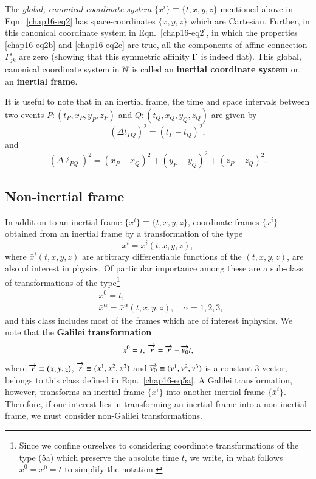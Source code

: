 The \textsl{global, canonical coordinate system} $\{x^i\}\equiv\{t, x,y,z\} $ mentioned above in Eqn.~\eqref{chap16-eq2} has space-coordinates $\{x,y,z\}$ which are Cartesian. Further, in this canonical coordinate system in Eqn.~\eqref{chap16-eq2}, in which the properties \eqref{chap16-eq2b} and \eqref{chap16-eq2c} are true, all the components of affine connection $\Gamma^i_{jk}$ are zero (showing that this  symmetric affinity $\mathbf{\Gamma}$ is indeed flat). This global, canonical coordinate system in $\mathbb{N}$ is called an \textbf{inertial coordinate system} or, an \textbf{inertial frame}. 

It is useful to note that in an inertial frame, the time and space intervals between two events $P:(t_P,x_P,y_P,z_P)$ and $Q:(t_Q,x_Q,y_Q,z_Q)$  are given by
\begin{equation}
(\Delta  t_{PQ})^2=(t_P-t_Q)^2,\label{chap16-eq3}
\end{equation}
and 
\begin{equation}
(\Delta  \ell_{PQ})^2=(x_P-x_Q)^2+(y_P-y_Q)^2+(z_P-z_Q)^2.\label{chap16-eq4}
\end{equation}

\subsection*{Non-inertial frame}\label{chap16-sec2.2}

In addition to an inertial frame $\{x^i\}\equiv\{t,x,y,z\}$, coordinate frames  $\{\bar{x}^i\}$ obtained from an inertial frame by a transformation of the type 
\begin{equation}
\bar{x}^i=\bar{x}^i(t, x,y,z),\label{chap16-eq5}
\end{equation}
where $\bar{x}^i (t, x,y,z)$ are arbitrary differentiable functions of the $(t, x,y,z)$,  are also of interest in physics. Of particular importance among these are a sub-class of transformations of the type\footnote{Since we confine ourselves to considering coordinate transformations of the type (5a) which preserve the absolute time $t$, we write, in what follows $\bar{x}^0=x^0=t$ to simplify the notation.} 
\begin{align*}
& \bar{x}^0= t,\\
& \bar{x}^\alpha=\bar{x}^\alpha(t, x,y,z),\quad \alpha=1,2,3,\tag{5a}\label{chap16-eq5a}
\end{align*}
and this class includes most of the  frames which are of interest in\break physics. We note that the \textbf{Galilei transformation} 
\begin{equation}
 \bar{x}^0=t,\;\overrightarrow{\bar{r}} =\overrightarrow{r}-\overrightarrow{v_0}t ,\label{chap16-eq6}
\end{equation}
where $\overrightarrow{{r}}\equiv  (x,y,z)$, $\overrightarrow{\bar{r}}\equiv  (\bar{x}^1,\bar{x}^2,\bar{x}^3)$ and $\overrightarrow{v_0}\equiv  (v^1,v^2,v^3)$ is a constant 3-vector, belongs to this class defined in Eqn.~\eqref{chap16-eq5a}. A Galilei transformation, however,  transforms an  inertial frame $\{x^i\}$ into another inertial frame $\{\bar{x}^i\}$. Therefore, if our interest lies in transforming an inertial frame into a non-inertial frame, we must consider non-Galilei transformations. 

